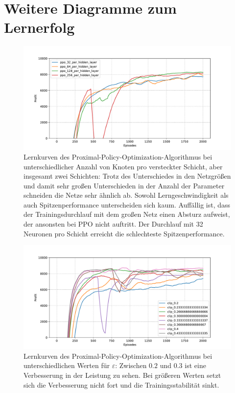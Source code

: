 \section{Weitere Diagramme zum Lernerfolg}
\begin{figure}[htb]
	\centering
	\includegraphics[width=\textwidth]{appendix/ppo_different_networks.pdf}
	\caption{
		Lernkurven des Proximal-Policy-Optimization-Algorithmus bei unterschiedlicher Anzahl von Knoten pro versteckter Schicht, aber insgesamt zwei Schichten:
        Trotz des Unterschiedes in den Netzgrößen und damit sehr großen Unterschieden in der Anzahl der Parameter schneiden die Netze sehr ähnlich ab.
        Sowohl Lerngeschwindigkeit als auch Spitzenperformance unterscheiden sich kaum.
        Auffällig ist, dass der Trainingsdurchlauf mit dem großen Netz einen Absturz aufweist, der ansonsten bei PPO nicht auftritt.
        Der Durchlauf mit 32 Neuronen pro Schicht erreicht die schlechteste Spitzenperformance.
	}
	\label{graphic:PPODifferentNetworks}
\end{figure}
\begin{figure}[htb]
	\centering
	\includegraphics[width=\textwidth]{appendix/ppo_different_clipping.pdf}
	\caption{
		Lernkurven des Proximal-Policy-Optimization-Algorithmus bei unterschiedlichen Werten für $\varepsilon$:
		Zwischen $0.2$ und $0.3$ ist eine Verbesserung in der Leistung zu sehen.
		Bei größeren Werten setzt sich die Verbesserung nicht fort und die Trainingsstabilität sinkt.
	}
	\label{graphic:PPODifferentClipping}
\end{figure}

